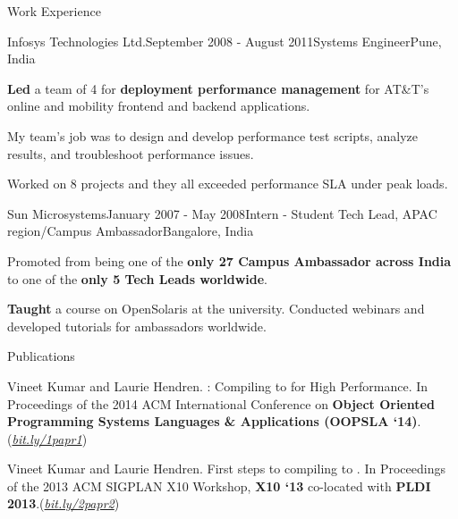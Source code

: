 \documentclass{resume} %
\begin{document}
\begin{rSection}{Work Experience}
\begin{rSubsection}{Infosys Technologies Ltd.}{September 2008 - August
        2011}{Systems Engineer}{Pune, India}
\item \textbf{Led} a team of 4 for \textbf{deployment performance management}
	for AT\&T's online and mobility frontend and backend applications.
\begin{lsubSubsection}
\item My team's job was to design and develop performance test scripts, analyze
	results, and troubleshoot performance issues.  
\item {Worked on 8 projects} and they all exceeded performance SLA under peak
	loads.
\end{lsubSubsection}
\end{rSubsection}

\begin{rSubsection}{Sun Microsystems}{January 2007 - May 2008}{Intern - Student
        Tech Lead, APAC region/Campus Ambassador}{Bangalore, India}
\item Promoted from being one of the \textbf{only 27 Campus Ambassador across
	India} to one of the \textbf{only 5 Tech Leads worldwide}.  
\begin{lsubSubsection}
\item \textbf{Taught} a course on OpenSolaris at the university. Conducted
	webinars and developed tutorials for ambassadors worldwide.
\end{lsubSubsection}
\end{rSubsection}
\end{rSection}


\begin{rSection}{Publications}
\smallskip
\begin{lSubsection}


\item Vineet Kumar and Laurie Hendren. \mixten: Compiling \matlab to \xten for
	High Performance. In Proceedings of the 2014 ACM International
	Conference on \textbf{Object Oriented Programming Systems Languages \&
	Applications (OOPSLA
	`14)}.(\href{http://bit.ly/1papr1}{\em{bit.ly/1papr1}})

%
\item Vineet Kumar and Laurie Hendren. First steps to compiling \matlab to
	\xten. In Proceedings of the 2013 ACM SIGPLAN X10 Workshop, \textbf{X10
	`13} co-located with \textbf{PLDI
	2013}.(\href{http://bit.ly/2papr2}{\em{bit.ly/2papr2}})
\end{lSubsection}
\end{rSection}
\end{document}
